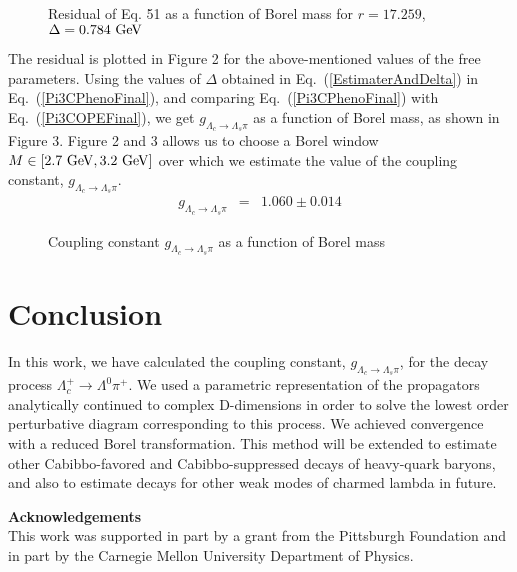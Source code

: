 \documentclass[twoside]{article}
\begin{document}
\begin{figure}
\begin{center}
\end{center}
\caption{Residual of Eq. 51 as a function of Borel mass for $r = 17.259$, 
$\Delta = 0.784~\rm{GeV}$}
\end{figure}

The residual is plotted in Figure 2 for the above-mentioned values of the free 
parameters. Using the values of $\Delta$ obtained in 
Eq.~(\ref{EstimaterAndDelta}) in Eq.~(\ref{Pi3CPhenoFinal}), and comparing 
Eq.~(\ref{Pi3CPhenoFinal}) with Eq.~(\ref{Pi3COPEFinal}), we get $g_{\Lambda_c 
\rightarrow \Lambda_s \pi}$ as a function of Borel mass, as shown in Figure 3. 
Figure 2 and 3 allows us to choose a Borel window $M \in \left[ 2.7~{\rm{GeV}},
 3.2~{\rm{GeV}} \right]$ over which we estimate the value of the coupling 
constant, $g_{\Lambda_c \rightarrow \Lambda_s \pi}$.
\begin{eqnarray}
g_{\Lambda_c \rightarrow \Lambda_s \pi} 
&=&
1.060 \pm 0.014
\end{eqnarray}

\begin{figure}
\begin{center}
\end{center}
\label{Figure 1}
\caption{Coupling constant $g_{\Lambda_c \rightarrow \Lambda_s \pi}$ as a function of 
Borel mass}
\end{figure}


\section{Conclusion}
In this work, we have calculated the coupling constant, $g_{\Lambda_c 
\rightarrow \Lambda_s \pi}$, for the decay process 
$\Lambda_c^+ \rightarrow \Lambda^0 \pi^+$. We used a parametric representation 
of the propagators analytically continued to complex D-dimensions in order to 
solve the lowest order perturbative diagram corresponding to this process. We 
achieved convergence with a reduced Borel transformation. This method will be 
extended to estimate other Cabibbo-favored and Cabibbo-suppressed decays of 
heavy-quark baryons, and also to estimate decays for other weak modes of 
charmed lambda in future.

\vspace{1cm} 
\Large{{\bf Acknowledgements}}\\
\normalsize
This work was supported in part by a grant from the Pittsburgh Foundation
and in part by the Carnegie Mellon University Department of Physics.
\vspace{2mm}
\end{document}
